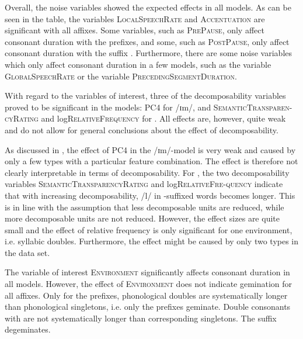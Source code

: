 Overall, the noise variables showed the expected effects in all models. As can be seen in the table, the variables \textsc{LocalSpeechRate} and \textsc{Accentuation} are significant with all affixes. 
Some variables, such as \textsc{PrePause}, only affect consonant duration with the prefixes, and some, such as \textsc{PostPause}, only affect consonant duration with the suffix .  
 Furthermore, there are some noise variables which only affect consonant duration in a few models, such as the variable \textsc{GlobalSpeechRate} or the variable \textsc{PrecedingSegmentDuration}. 

With regard to the variables of interest, three of the decomposability variables proved to be significant in the models: \textsc{PC4} for /ɪm/, and \textsc{SemanticTransparen- cyRating} and log\textsc{RelativeFrequency} for . 
 All effects are, however, quite weak and do not allow for general conclusions about the effect of decomposability. 
 
 As discussed in , the effect of \textsc{PC4} in the /ɪm/-model is very weak and caused by only a few types with a particular feature combination. The effect is therefore not clearly interpretable in terms of decomposability. 
 For , the two decomposability variables \textsc{SemanticTransparencyRating} and log\textsc{RelativeFre-quency} indicate that with increasing decomposability, /l/ in -suffixed words becomes longer. This is in line with the assumption that less decomposable units are reduced, while more decomposable units are not reduced. However, the effect sizes are quite small and the effect of relative frequency is only significant for one environment, i.e. syllabic doubles. 
Furthermore, the effect might be caused by only two types in the data set.


%
The variable of interest \textsc{Environment} significantly affects consonant duration in all models. 
However, the effect of \textsc{Environment} does not indicate gemination for all affixes. Only for the prefixes, phonological doubles are systematically longer than phonological singletons, i.e. only the prefixes geminate. Double consonants with  are not systematically longer than corresponding singletons. The suffix  degeminates.  


